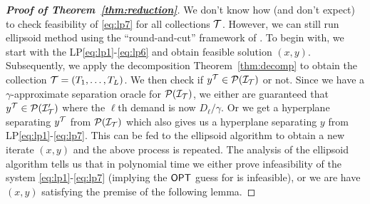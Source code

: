 \begin{proof}[{\bf Proof of Theorem~\ref{thm:reduction}}]
\noindent
We don't know how (and don't expect) to check feasibility of  \eqref{eq:lp7} for all collections ${\cal T}$. However, we can still run ellipsoid method using the ``round-and-cut'' framework of \cite{carr et al, an et al, shi li}.
To begin with, we start with the LP\eqref{eq:lp1}-\eqref{eq:lp6} and obtain feasible solution $(x,y)$. Subsequently, we apply the decomposition Theorem~\ref{thm:decomp} to obtain the collection ${\cal T} = (T_1,\ldots,T_L)$.
We then check if $y^{\cal T} \in {\cal P}({\cal I}_{\cal T})$ or not. Since we have a $\gamma$-approximate separation oracle for ${\cal P}({\cal I}_{\cal T})$, we either are guaranteed that $y^{\cal T} \in {\cal P}({\cal I}'_{\cal T})$ where the $\ell$th demand is now  $D_\ell/\gamma$. Or we get a hyperplane separating $y^{\cal T}$ from ${\cal P}({\cal I}_{\cal T})$ which also gives us a
hyperplane separating $y$ from  LP\eqref{eq:lp1}-\eqref{eq:lp7}. This can be fed to the ellipsoid algorithm to obtain a new iterate $(x,y)$ and the above process is repeated. The analysis of the ellipsoid algorithm
tells us that in polynomial time we either prove infeasibility of the system \eqref{eq:lp1}-\eqref{eq:lp7} (implying the $\mathsf{OPT}$  guess for \mckc is infeasible), or we 
are have $(x,y)$ satisfying the premise of the following lemma. 


\end{proof}
